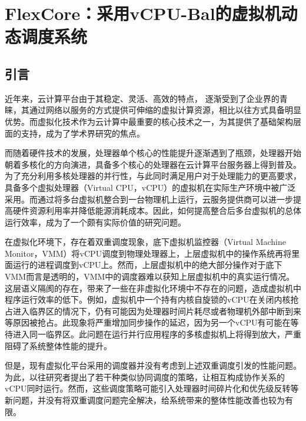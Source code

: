
\chapter{FlexCore：采用vCPU-Bal的虚拟机动态调度系统}
\label{chap:flexcore}



\section{引言}

近年来，云计算平台由于其稳定、灵活、高效的特点， 逐渐受到了企业界的青睐，其通过网络以服务的方式提供可伸缩的虚拟计算资源，相比以往方式具备明显优势。而虚拟化技术作为云计算中最重要的核心技术之一，为其提供了基础架构层面的支持，成为了学术界研究的焦点\cite{barham2003xen}\cite{kivity2007kvm}。

而随着硬件技术的发展，处理器单个核心的性能提升逐渐遇到了瓶颈，处理器开始朝着多核化的方向演进，具备多个核心的处理器在云计算平台服务器上得到普及。为了充分利用多核处理器的并行性，与此同时满足用户对于处理能力的更高要求，具备多个虚拟处理器（Virtual CPU，vCPU）的虚拟机在实际生产环境中被广泛采用\cite{xu2009performance}。而通过将多台虚拟机整合到一台物理机上运行，云服务提供商可以进一步提高硬件资源利用率并降低能源消耗成本\cite{lv2012virtualization}。因此，如何提高整合后多台虚拟机的总体运行效率，成为了一个颇有实际价值的研究问题。

在虚拟化环境下，存在着双重调度现象\cite{song2013schedule}，底下虚拟机监控器（Virtual Machine Monitor，VMM）将vCPU调度到物理处理器上，上层虚拟机中的操作系统再将里面运行的进程调度到vCPU上。然而，上层虚拟机中的绝大部分操作对于底下VMM而言是透明的，VMM中的调度器难以获知上层虚拟机中的真实运行情况。这层语义隔阂\cite{chen2001virtual}的存在，带来了一些在非虚拟化环境中不存在的问题，造成虚拟机中程序运行效率的低下。例如，虚拟机中一个持有内核自旋锁的vCPU在关闭内核抢占进入临界区的情况下，仍有可能因为处理器时间片耗尽或者物理机外部中断到来等原因被抢占。此现象将严重增加同步操作的延迟，因为另一个vCPU有可能在等待进入同一临界区。此问题在运行并行应用程序的多核虚拟机上将得到放大，严重阻碍了系统整体性能的提升。

但是，现有虚拟化平台采用的调度器并没有考虑到上述双重调度引发的性能问题。为此，以往研究者提出了若干种类似协同调度的策略\cite{weng2009hybrid}\cite{sukwong2011co}\cite{bai2010task}，让相互构成协作关系的vCPU同时运行。然而，这些调度策略可能引入处理器时间碎片化和优先级反转等新问题，并没有将双重调度问题完全解决，给系统带来的整体性能改善也较为有限。

